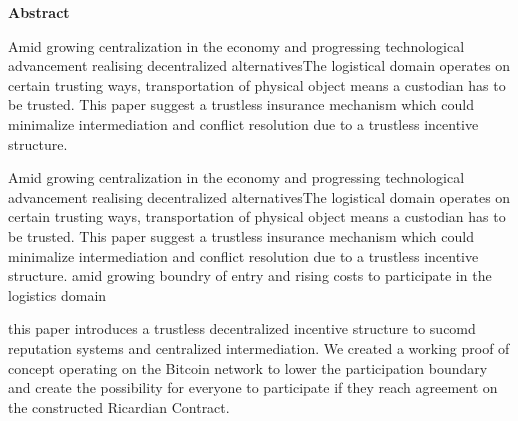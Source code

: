\thispagestyle{plain}
\begin{center}
    \vspace{0.9cm}
    \textbf{Abstract}
\end{center}

Amid growing centralization in the economy and progressing technological advancement realising decentralized alternativesThe logistical domain operates on certain trusting ways, transportation of physical object means a custodian has to be trusted. This paper suggest a trustless insurance mechanism which could minimalize intermediation and conflict resolution due to a trustless incentive structure.

Amid growing centralization in the economy and progressing technological advancement realising decentralized alternativesThe logistical domain operates on certain trusting ways, transportation of physical object means a custodian has to be trusted. This paper suggest a trustless insurance mechanism which could minimalize intermediation and conflict resolution due to a trustless incentive structure.
amid growing boundry of entry and rising costs to participate in the logistics domain

this paper introduces a trustless decentralized incentive structure to sucomd reputation systems and centralized intermediation. We created a working proof of concept operating on the Bitcoin network to lower the participation boundary and create the possibility for everyone to participate if they reach agreement on the constructed Ricardian Contract.

%
%
